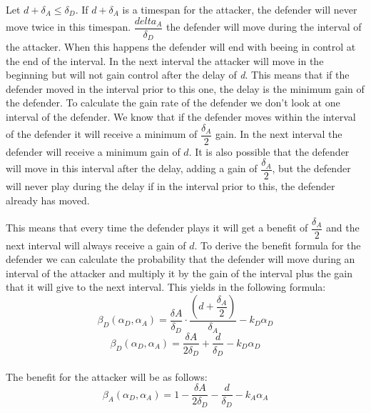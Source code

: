 Let $d + \delta_{A} \leq \delta_{D}$. If $d + \delta_{A}$  is a timespan for the attacker, the defender will never move twice in this timespan.  $\dfrac{delta_{A}}{\delta_{D}}$ the defender will move during the interval of the attacker. When this happens the defender will end with beeing in control at the end of the interval. In the next interval the attacker will move in the beginning but will not gain control after the delay of \textit{d}. This means that if the defender moved in the interval prior to this one, the delay is the minimum gain of the defender. To calculate the gain rate of the defender we don't look at one interval of the defender. We know that if the defender moves within the interval of the defender it will receive a minimum of $\dfrac{\delta_{A}}{2}$ gain. In the next interval the defender will receive a minimum gain of $d$. It is also possible that the defender will move in this interval after the delay, adding a gain of $\dfrac{\delta_{A}}{2}$, but the defender will never play during the delay if in the interval prior to this, the defender already has moved. 

This means that every time the defender plays it will get a benefit of $\dfrac{\delta_{A}}{2}$ and the next interval will always receive a gain of $d$. To derive the benefit formula for the defender we can calculate the probability that the defender will move during an interval of the attacker and multiply it by the gain of the interval plus the gain that it will give to the next interval. 
This yields in the following formula:
\begin{equation}\label{first}
\beta_{D}(\alpha_{D},\alpha_{A}) = \dfrac{\delta{A}}{\delta_{D}} \cdot \dfrac{(d+\dfrac{\delta_{A}}{2})}{\delta_{A}} - k_{D} \alpha_{D} 
\end{equation}
\begin{equation}\label{first}
\beta_{D}(\alpha_{D},\alpha_{A}) = \dfrac{\delta{A}}{2\delta_{D}} + \dfrac{d}{\delta_{D}} - k_{D} \alpha_{D} 
\end{equation}\\

The benefit for the attacker will be as follows:
\begin{equation}\label{first}
\beta_{A}(\alpha_{D},\alpha_{A}) = 1 -\dfrac{\delta{A}}{2\delta_{D}} - \dfrac{d}{\delta_{D}} - k_{A} \alpha_{A} 
\end{equation}\\

